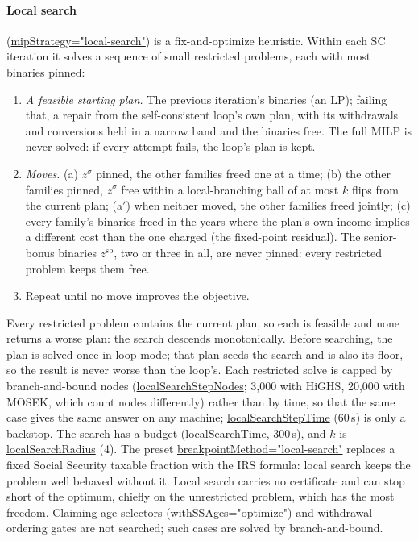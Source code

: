 \documentclass[fleqn,12pt]{report}
\newcommand{\code}[1]{\url{#1}}
\begin{document}
\paragraph*{Local search} (\code{mipStrategy="local-search"}) is a fix-and-optimize
heuristic. Within each SC iteration it solves a sequence of small restricted problems, each
with most binaries pinned:
\begin{enumerate}[nosep]
  \item \emph{A feasible starting plan.} The previous iteration's binaries (an LP); failing
    that, a repair from the self-consistent loop's own plan, with its withdrawals and
    conversions held in a narrow band and the binaries free. The full MILP is never solved:
    if every attempt fails, the loop's plan is kept.
  \item \emph{Moves.} (a) $z^\sigma$ pinned, the other families freed one at a time;
    (b) the other families pinned, $z^\sigma$ free within a local-branching ball of at most
    $k$ flips from the current plan; (a$'$) when neither moved, the other families freed
    jointly; (c) every family's binaries freed in the years where the plan's own income
    implies a different cost than the one charged (the fixed-point residual). The senior-bonus
    binaries $z^{\mathrm{sb}}$, two or three in all, are never pinned: every restricted
    problem keeps them free.
  \item Repeat until no move improves the objective.
\end{enumerate}
Every restricted problem contains the current plan, so each is feasible and none returns a
worse plan: the search descends monotonically. Before searching, the plan is solved once in
loop mode; that plan seeds the search and is also its floor, so the result is never worse
than the loop's. Each restricted solve is capped by branch-and-bound nodes
(\code{localSearchStepNodes}; 3{,}000 with HiGHS, 20{,}000 with MOSEK, which count nodes
differently) rather than by time, so that the same case gives the same answer on any machine;
\code{localSearchStepTime} (60\,s) is only a backstop. The search has a budget
(\code{localSearchTime}, 300\,s), and $k$ is \code{localSearchRadius} (4). The preset
\code{breakpointMethod="local-search"} replaces a fixed Social Security taxable fraction with the
IRS formula: local search keeps the problem well behaved without it. Local search carries no certificate and can stop short of the optimum, chiefly on the
unrestricted problem, which has the most freedom. Claiming-age selectors
(\code{withSSAges="optimize"}) and withdrawal-ordering gates are not searched; such cases are
solved by branch-and-bound.
\end{document}

